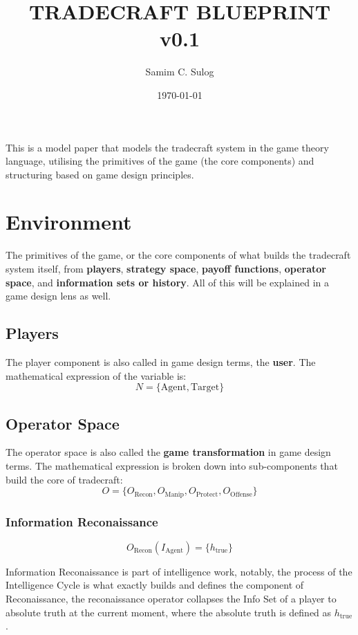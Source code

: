 \documentclass{article}
\title{TRADECRAFT BLUEPRINT v0.1}
\author{Samim C. Sulog}
\date{\today}
\begin{document}
\maketitle
This is a model paper that models the tradecraft system in the game theory language, utilising the primitives of the game (the core components) and structuring based on game design principles.

\section{Environment}
The primitives of the game, or the core components of what builds the tradecraft system itself, from \textbf{players}, \textbf{strategy space}, \textbf{payoff functions}, \textbf{operator space}, and \textbf{information sets or history}. All of this will be explained in a game design lens as well.

\subsection{Players}
The player component is also called in game design terms, the \textbf{user}. The mathematical expression of the variable is:
\[
N = \{\text{Agent}, \text{Target}\}
\]

\subsection{Operator Space}
The operator space is also called the \textbf{game transformation} in game design terms. The mathematical expression is broken down into sub-components that build the core of tradecraft:
\[
O = \{O_{\text{Recon}}, O_{\text{Manip}}, O_{\text{Protect}}, O_{\text{Offense}}\}
\]

\subsubsection{Information Reconaissance}
\[
O_{\text{Recon}}(I_{\text{Agent}}) = \{h_{\text{true}}\}
\]
\begin{small}
Information Reconaissance is part of intelligence work, notably, the process of the Intelligence Cycle is what exactly builds and defines the component of Reconaissance, the reconaissance operator collapses the Info Set of a player to absolute truth at the current moment, where the absolute truth is defined as $h_{\text{true}}$. 
\end{small}
\end{document}
